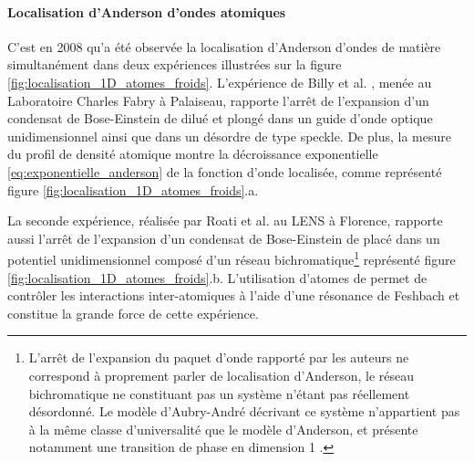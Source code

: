 \paragraph*{Localisation d'Anderson d'ondes atomiques}
C'est en 2008 qu'a été observée la localisation d'Anderson d'ondes de matière simultanément dans deux expériences illustrées sur la figure \ref{fig:localisation_1D_atomes_froids}. L'expérience de Billy et al. \citep{billy2008direct}, menée au Laboratoire Charles Fabry à Palaiseau, rapporte l'arrêt de l'expansion d'un condensat de Bose-Einstein de  dilué et plongé dans un guide d'onde optique unidimensionnel ainsi que dans un désordre de type speckle. De plus, la mesure du profil de densité atomique montre la décroissance exponentielle \ref{eq:exponentielle_anderson} de la fonction d'onde localisée, comme représenté figure \ref{fig:localisation_1D_atomes_froids}.a. 

La seconde expérience, réalisée par Roati et al. \citep{roati2008anderson} au LENS à Florence, rapporte aussi l'arrêt de l'expansion d'un condensat de Bose-Einstein de  placé dans un potentiel unidimensionnel composé d'un réseau bichromatique\footnote{L'arrêt de l'expansion du paquet d'onde rapporté par les auteurs ne correspond à proprement parler de localisation d'Anderson, le réseau bichromatique ne constituant pas un système n'étant pas réellement désordonné. Le modèle d'Aubry-André décrivant ce système n'appartient pas à la même classe d'universalité que le modèle d'Anderson, et présente notamment une transition de phase en dimension 1 \citep{sarma1988mobility}.} représenté figure \ref{fig:localisation_1D_atomes_froids}.b. L'utilisation d'atomes de  permet de contrôler les interactions inter-atomiques à l'aide d'une résonance de Feshbach et constitue la grande force de cette expérience.

